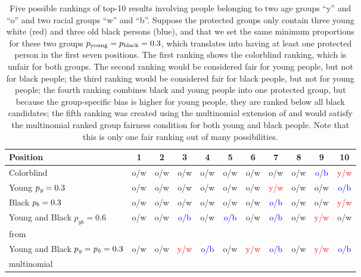 \begin{table}[t]
	\caption[Introductory example for the extension of \algoFAIR to multiple protected groups]{Five possible rankings of top-10 results involving people belonging to two age groups ``y'' and ``o'' and two racial groups ``w'' and ``b''.
		Suppose the protected groups only contain three young white (red) and three old black persons (blue), and that we set the same minimum proportions for these two groups $p_{\text{young}} = p_{\text{black}} = 0.3$, which translates into having at least one protected person in the first seven positions.
		The first ranking shows the colorblind ranking, which is unfair for both groups.
		The second ranking would be considered fair for young people, but not for black people; the third ranking would be considered fair for black people, but not for young people; the fourth ranking combines black and young people into one protected group, but because the group-specific bias is higher for young people, they are ranked below all black candidates; the fifth ranking was created using the multinomial extension of \algoFAIR and would satisfy the multinomial ranked group fairness condition for both young and black people.
		Note that this is only one fair ranking out of many possibilities.
		\label{tbl:multinomial_intro_example}}
	\centering\begin{tabular}{lcccccccccc}\toprule
		Position & 1 &2 & 3 &4& 5& 6& 7& 8& 9& 10  \\
		\midrule
		\rowcolor[HTML]{C0C0C0}
		Colorblind & o/w & o/w & o/w & o/w & o/w & o/w & o/w & o/w & \textcolor{blue}{o/b} & \textcolor{red}{y/w} \\
		Young $p_\textit{y}=0.3$ & o/w &o/w& o/w& o/w& o/w& o/w& \textcolor{red}{y/w}& o/w & o/w & \textcolor{blue}{o/b} \\
		\rowcolor[HTML]{C0C0C0}
		Black $p_b=0.3$ & o/w &o/w &o/w& o/w &o/w &o/w& \textcolor{blue}{o/b}& o/w& o/w& \textcolor{red}{y/w} \\
		Young and Black $p_{\textit{yb}}=0.6$& o/w &o/w& \textcolor{blue}{o/b} & o/w& \textcolor{blue}{o/b}& o/w & \textcolor{blue}{o/b}& o/w& \textcolor{red}{y/w}& o/w \\
		\algoFAIR from~\cite{zehlike2017fair} &&&&&&&&&&\\
		\rowcolor[HTML]{C0C0C0}
		Young and Black $p_{\textit{y}} = p_{\textit{b}} = 0.3$& o/w& o/w &\textcolor{red}{y/w}& \textcolor{blue}{o/b}& o/w& \textcolor{red}{y/w} &\textcolor{blue}{o/b}& o/w& \textcolor{red}{y/w}& \textcolor{blue}{o/b} \\
		\rowcolor[HTML]{C0C0C0}
		multinomial \algoFAIR &&&&&&&&&&\\
		\bottomrule
	\end{tabular}
\end{table}

